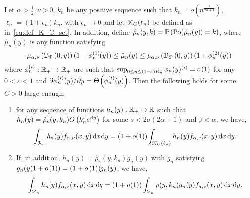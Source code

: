 \begin{lemma}\label{lem:concentration_argument_rho_approximation}
Let $\alpha > \frac{1}{2}, \nu > 0$, $k_n$ be any positive sequence such that $k_n = o(n^{\frac{1}{2\alpha + 1}})$, $\ell_n = (1 + \epsilon_n)k_n$, with $\epsilon_n \to 0$ and let ${\mathcal K}_{C}(\ell_n)$ be defined as in~\eqref{eq:def_K_C_set}. In addition, define $\hat{\rho}_n(y,k) = \mathbb{P}\left({\mathrm{Po}}(\hat{\mu}_n(y)) = k\right)$, where $\hat{\mu}_n(y)$ is any function satisfying 
\[
	\mu_{\alpha,\nu}\left({\mathcal B}_{{\mathcal P}}\left(0,y\right)\right)(1 - \phi_n^{(1)}(y)) \le \hat{\mu}_n(y) \le \mu_{\alpha,\nu}\left({\mathcal B}_{{\mathcal P}}\left(0,y\right)\right)(1 + \phi_n^{(2)}(y))
\]
where $\phi_n^{(i)} : {\mathbb R}_+ \to {\ensuremath{\mathbb R}}_+$ are such that $\sup_{0 \le y \le (1-\varepsilon)R_n} \phi_n(y)^{(i)} = o\left(1\right)$ for any $0 < \varepsilon < 1$ and $\partial \phi_n^{(i)}(y)/\partial y = \Theta\left(\phi_n^{(i)}(y)\right)$. Then the following holds for some $C > 0$ large enough:
\begin{enumerate}
\item for any sequence of functions $h_n(y) : {\mathbb R}_+ \mapsto {\ensuremath{\mathbb R}}$ such that $h_n(y) = \hat{\rho}_n(y,k_n) O\left(k_n^s e^{\beta y}\right)$ for some $s < 2\alpha(2\alpha + 1)$ and $\beta < \alpha$, we have,
\[
	\int_{{\mathcal R}_n} h_n(y) f_{\alpha,\nu}(x,y) \operatorname{\mathrm{d}\hspace{-2pt}} x \operatorname{\mathrm{d}\hspace{-2pt}} y 
	= (1 + o(1)) \int_{{\mathcal K}_{C}(\ell_n)} h_n(y) f_{\alpha,\nu}(x,y) \operatorname{\mathrm{d}\hspace{-2pt}} x \operatorname{\mathrm{d}\hspace{-2pt}} y.
\]
\item If, in addition, $h_n(y) = \hat{\rho}_n(y,k_n) g_n(y)$ with $g_n$ satisfying $g_n(y(1+o\left(1\right)) = (1+o\left(1\right))g_n(y)$, we have,
\[
	\int_{{\mathcal R}_n} h_n(y) f_{\alpha,\nu}(x,y) \operatorname{\mathrm{d}\hspace{-2pt}} x \operatorname{\mathrm{d}\hspace{-2pt}} y 
	= (1 + o(1)) \int_{{\mathcal R}_n} \rho(y,k_n) g_n(y) f_{\alpha,\nu}(x,y) \operatorname{\mathrm{d}\hspace{-2pt}} x \operatorname{\mathrm{d}\hspace{-2pt}} y.
\]
\end{enumerate}
\end{lemma}

